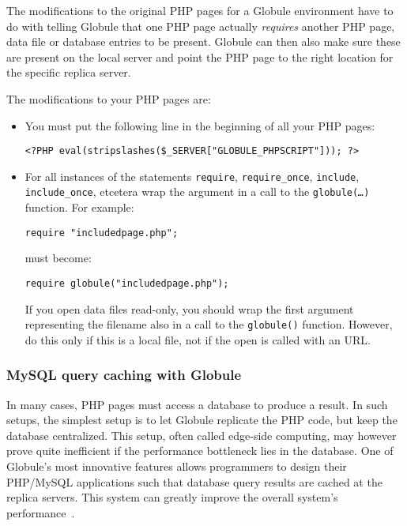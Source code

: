 \documentclass[10pt,a4paper]{article}
\makeatletter
\newenvironment{p}{\@open{P}{}}{\@close{P}}
\newenvironment{p}{}{\par}
\makeatother
\begin{document}
\begin{p}
The modifications to the original PHP pages for a Globule environment have to
do with telling Globule that one PHP page actually \emph{requires} another PHP
page, data file or database entries to be present.  Globule can then also make
sure these are present on the local server and point the PHP page to the right
location for the specific replica server.
\end{p}

\begin{p}
The modifications to your PHP pages are:
\end{p}

\begin{p}
\begin{itemize}
\item You must put the following line in the beginning of all your PHP pages:
\begin{Verbatim}
<?PHP eval(stripslashes($_SERVER["GLOBULE_PHPSCRIPT"])); ?>
\end{Verbatim}
\item For all instances of the statements \verb!require!, \verb!require_once!,
\verb!include!, \verb!include_once!, etcetera wrap the argument in a call to
the \texttt{globule(\textit{\ldots})} function.  For example:
\begin{Verbatim}
require "includedpage.php";
\end{Verbatim}
must become:
\begin{Verbatim}
require globule("includedpage.php");
\end{Verbatim}
If you open data files read-only, you should wrap the first argument
representing the filename also in a call to the \texttt{globule()}
function.  However, do this only if this is a local file, not if the
open is called with an URL.
\end{itemize}
\end{p}


\subsubsection{\label{sec:dynamicdb}MySQL query caching with Globule}

\begin{p}
In many cases, PHP pages must access a database to produce a result.
In such setups, the simplest setup is to let Globule replicate the PHP
code, but keep the database centralized. This setup, often called
edge-side computing, may however prove quite inefficient if the
performance bottleneck lies in the database. One of Globule's most
innovative features allows programmers to design their PHP/MySQL
applications such that database query results are cached at the
replica servers. This system can greatly improve the overall system's
performance~\cite{swami2005c}.
\end{p}
\end{document}

